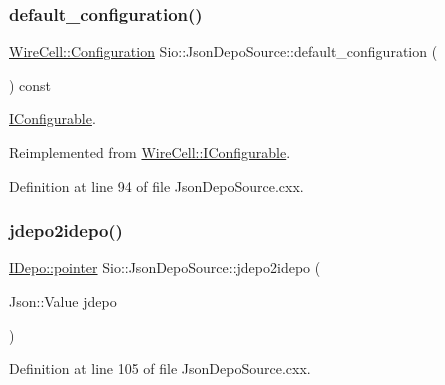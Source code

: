 \subsubsection{\texorpdfstring{default\+\_\+configuration()}{default\_configuration()}}
{\footnotesize\ttfamily \hyperlink{namespace_wire_cell_a9f705541fc1d46c608b3d32c182333ee}{Wire\+Cell\+::\+Configuration} Sio\+::\+Json\+Depo\+Source\+::default\+\_\+configuration (\begin{DoxyParamCaption}{ }\end{DoxyParamCaption}) const\hspace{0.3cm}{\ttfamily [virtual]}}



\hyperlink{class_wire_cell_1_1_i_configurable}{I\+Configurable}. 



Reimplemented from \hyperlink{class_wire_cell_1_1_i_configurable_a54841b2da3d1ea02189478bff96f7998}{Wire\+Cell\+::\+I\+Configurable}.



Definition at line 94 of file Json\+Depo\+Source.\+cxx.

\mbox{\label{class_wire_cell_1_1_sio_1_1_json_depo_source_a55175816f32320c06cf760ebf9c1e3a3}} 
\subsubsection{\texorpdfstring{jdepo2idepo()}{jdepo2idepo()}}
{\footnotesize\ttfamily \hyperlink{class_wire_cell_1_1_i_data_aff870b3ae8333cf9265941eef62498bc}{I\+Depo\+::pointer} Sio\+::\+Json\+Depo\+Source\+::jdepo2idepo (\begin{DoxyParamCaption}\item[{Json\+::\+Value}]{jdepo }\end{DoxyParamCaption})}



Definition at line 105 of file Json\+Depo\+Source.\+cxx.

